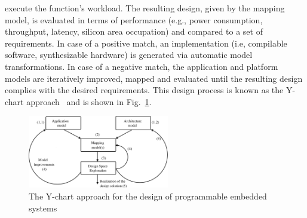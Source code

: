 \documentclass{llncs}
\begin{document}
execute the function's workload. The resulting design, given by the mapping model, is evaluated in terms
of performance (e.g., power consumption, throughput, latency, silicon area occupation) and compared to a set of
requirements. In case of a positive match, an implementation (i.e, compilable software, synthesizable hardware) is
generated via automatic model transformations. In case of a negative match, the application and platform models are
iteratively improved, mapped and evaluated until the resulting design complies with the desired requirements.
This design process is known as the Y-chart approach~\cite{YChart} and is shown in Fig.~\ref{fig:Ychart}.
%
\begin{figure}[htbp]
	\centering
	\includegraphics[width=0.55\textwidth]{./figures/ApproachY.pdf}
	\caption{The Y-chart approach for the design of programmable embedded systems}
	\label{fig:Ychart}
\end{figure}
%
\end{document}
